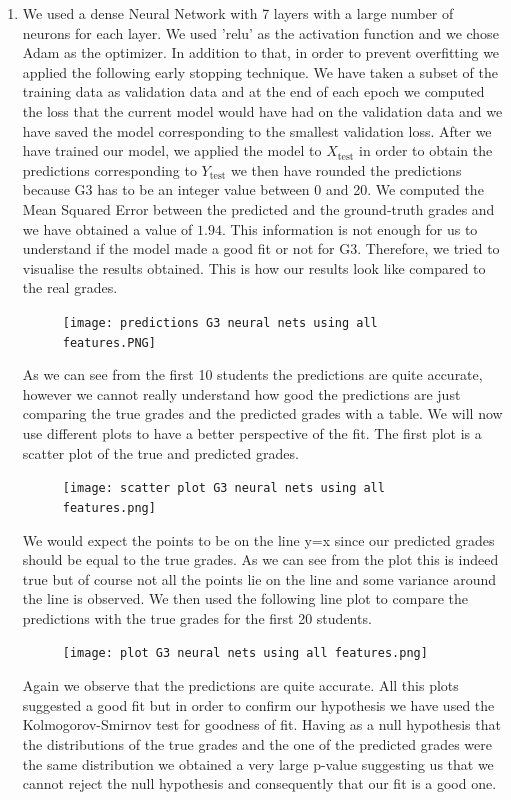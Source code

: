 \documentclass[a4paper, 11pt]{report}
\theoremstyle{definition}
\numberwithin{equation}{section}		%
\numberwithin{figure}{section}			%
\numberwithin{table}{section}				%
\begin{document}
\begin{enumerate}
    \item We used a dense Neural Network with 7 layers with a large number of neurons for each layer. We used 'relu' as the activation function and we chose Adam as the optimizer. In addition to that, in order to prevent overfitting we applied the following early stopping technique. We have taken a subset of the training data as validation data and at the end of each epoch we computed the loss that the current model would have had on the validation data and we have saved the model corresponding to the smallest validation loss. After we have trained our model, we applied the model to $X_{\text{test}}$ in order to obtain the predictions corresponding to $Y_{\text{test}}$ we then have rounded the predictions because G3 has to be an integer value between 0 and 20. We computed the Mean Squared Error between the predicted and the ground-truth grades and we have obtained a value of $1.94$. This information is not enough for us to understand if the model made a good fit or not for G3. Therefore, we tried to visualise the results obtained.
    This is how our results look like compared to the real grades.
    \begin{figure}[h]\centering
\texttt{[image: predictions G3 neural nets using all features.PNG]}
\end{figure}
As we can see from the first 10 students the predictions are quite accurate, however we cannot really understand how good the predictions are just comparing the true grades and the predicted grades with a table. We will now use different plots to have a better perspective of the fit. The first plot is a scatter plot of the true and predicted grades.
    \begin{figure}[h]\centering
\texttt{[image: scatter plot G3 neural nets using all features.png]}
\end{figure}
We would expect the points to be on the line y=x since our predicted grades should be equal to the true grades. As we can see from the plot this is indeed true but of course not all the points lie on the line and some variance around the line is observed. We then used the following line plot to compare the predictions with the true grades for the first 20 students.
    \begin{figure}[h]\centering
\texttt{[image: plot G3 neural nets using all features.png]}
\end{figure}
Again we observe that the predictions are quite accurate.
All this plots suggested a good fit but in order to confirm our hypothesis we have used the Kolmogorov-Smirnov test for goodness of fit. Having as a null hypothesis that the distributions of the true grades and the one of the predicted grades were the same distribution we obtained a very large p-value suggesting us that we cannot reject the null hypothesis and consequently that our fit is a good one.

\end{enumerate}
\end{document}
